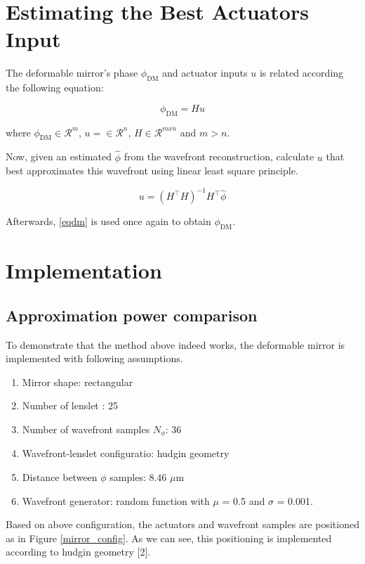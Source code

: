 \documentclass[]{article}
\begin{document}
\section{Estimating the Best Actuators Input}
The deformable mirror's phase $ \phi_{\text{DM}} $ and actuator inputs $ u $ is related according the following equation:

\begin{equation}
\phi_{\text{DM}} = Hu
\label{eqdm}
\end{equation}

where $ \phi_{\text{DM}} \in \mathcal{R}^m $, $ u = \in \mathcal{R}^n $, $ H \in \mathcal{R}^{mxn} $ and $ m>n $.

Now, given an estimated $ \hat{\phi} $ from the wavefront reconstruction, calculate $u$ that best approximates this wavefront using linear least square principle.

\begin{equation}
u = (H^\top H)^{-1}H^\top \hat{\phi}
\end{equation}


Afterwards, \eqref{eqdm} is used once again to obtain $ \phi_{\text{DM}} $.

\section{Implementation}

\subsection{Approximation power comparison}
To demonstrate that the method above indeed works, the deformable mirror is implemented with following assumptions. 

\begin{enumerate}
\item Mirror shape: rectangular
\item Number of lenslet : 25
\item Number of wavefront samples $ N_{\phi} $: 36 
\item Wavefront-lenslet configuratio: hudgin geometry
\item Distance between $ \phi $ samples: 8.46 $ \mu $m
\item Wavefront generator: random function   with $ \mu $ = 0.5 and $ \sigma $ = 0.001.
\end{enumerate}

Based on above configuration, the actuators and wavefront samples are positioned as in Figure \ref{mirror_config}. As we can see, this positioning is implemented according to hudgin geometry [2].
\end{document}
